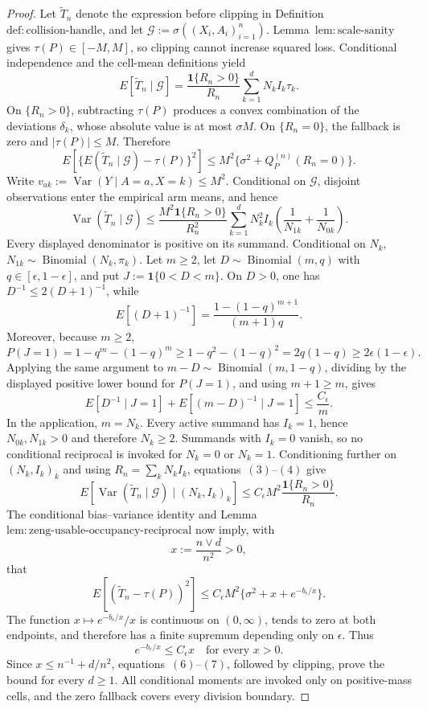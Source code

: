 \documentclass{article}
\begin{document}
\begin{proof}
Let \(\widetilde T_n\) denote the expression before clipping in Definition~\(\mathrm{def:collision\text{-}handle}\), and let \(\mathcal G:=\sigma((X_i,A_i)_{i=1}^n)\).  Lemma~\(\mathrm{lem:scale\text{-}sanity}\) gives \(\tau(P)\in[-M,M]\), so clipping cannot increase squared loss.  Conditional independence and the cell-mean definitions yield
\[
 E[\widetilde T_n\mid\mathcal G]
 =\frac{\mathbf 1\{R_n>0\}}{R_n}\sum_{k=1}^dN_kI_k\tau_k.
\tag{1}
\]
On \(\{R_n>0\}\), subtracting \(\tau(P)\) produces a convex combination of the deviations \(\delta_k\), whose absolute value is at most \(\sigma M\).  On \(\{R_n=0\}\), the fallback is zero and \(|\tau(P)|\le M\).  Therefore
\[
 E\!\left[\{E(\widetilde T_n\mid\mathcal G)-\tau(P)\}^2\right]
 \le M^2\{\sigma^2+Q_P^{(n)}(R_n=0)\}.
\tag{2}
\]
Write \(v_{ak}:=\operatorname{Var}(Y\mid A=a,X=k)\le M^2\).  Conditional on \(\mathcal G\), disjoint observations enter the empirical arm means, and hence
\[
 \operatorname{Var}(\widetilde T_n\mid\mathcal G)
 \le \frac{M^2\mathbf 1\{R_n>0\}}{R_n^2}
 \sum_{k=1}^dN_k^2I_k\left(\frac1{N_{1k}}+\frac1{N_{0k}}\right).
\tag{3}
\]
Every displayed denominator is positive on its summand.  Conditional on \(N_k\), \(N_{1k}\sim\operatorname{Binomial}(N_k,\pi_k)\).  Let \(m\ge2\), let \(D\sim\operatorname{Binomial}(m,q)\) with \(q\in[\epsilon,1-\epsilon]\), and put \(J:=\mathbf1\{0<D<m\}\).  On \(D>0\), one has \(D^{-1}\le2(D+1)^{-1}\), while
\[
 E[(D+1)^{-1}]=\frac{1-(1-q)^{m+1}}{(m+1)q}.
\]
Moreover, because \(m\ge2\),
\[
 P(J=1)=1-q^m-(1-q)^m
 \ge 1-q^2-(1-q)^2
 =2q(1-q)
 \ge2\epsilon(1-\epsilon).
\]
Applying the same argument to \(m-D\sim\operatorname{Binomial}(m,1-q)\), dividing by the displayed positive lower bound for \(P(J=1)\), and using \(m+1\ge m\), gives
\[
 E[D^{-1}\mid J=1]+E[(m-D)^{-1}\mid J=1]
 \le \frac{C_{\epsilon}}m.
\tag{4}
\]
In the application, \(m=N_k\).  Every active summand has \(I_k=1\), hence \(N_{0k},N_{1k}>0\) and therefore \(N_k\ge2\).  Summands with \(I_k=0\) vanish, so no conditional reciprocal is invoked for \(N_k=0\) or \(N_k=1\).  Conditioning further on \((N_k,I_k)_k\) and using \(R_n=\sum_kN_kI_k\), equations~\((3)\)--\((4)\) give
\[
 E[\operatorname{Var}(\widetilde T_n\mid\mathcal G)\mid(N_k,I_k)_k]
 \le C_{\epsilon}M^2\frac{\mathbf1\{R_n>0\}}{R_n}.
\tag{5}
\]
The conditional bias--variance identity and Lemma~\(\mathrm{lem:zeng\text{-}usable\text{-}occupancy\text{-}reciprocal}\) now imply, with
\[
 x:=\frac{n\vee d}{n^2}>0,
\]
that
\[
 E[(\widetilde T_n-\tau(P))^2]
 \le C_{\epsilon}M^2\{\sigma^2+x+e^{-b_{\epsilon}/x}\}.
\tag{6}
\]
The function \(x\mapsto e^{-b_{\epsilon}/x}/x\) is continuous on \((0,\infty)\), tends to zero at both endpoints, and therefore has a finite supremum depending only on \(\epsilon\).  Thus
\[
 e^{-b_{\epsilon}/x}\le C_{\epsilon}x
 \quad\text{for every }x>0.
\tag{7}
\]
Since \(x\le n^{-1}+d/n^2\), equations~\((6)\)--\((7)\), followed by clipping, prove the bound for every \(d\ge1\).  All conditional moments are invoked only on positive-mass cells, and the zero fallback covers every division boundary.
\end{proof}
\end{document}
